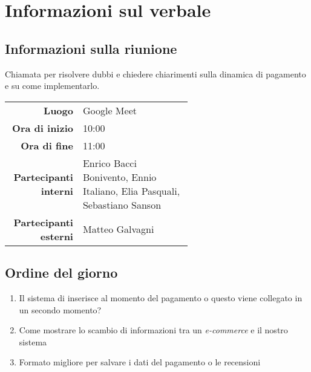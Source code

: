 \section{Informazioni sul verbale}

\subsection{Informazioni sulla riunione}
Chiamata per risolvere dubbi e chiedere chiarimenti sulla dinamica di pagamento e su come implementarlo.

\begin{center}
	\begin{tabular}{r|p{0.6\linewidth}}
		\toprule
		\textbf{Luogo} & Google Meet \\
		\textbf{Ora di inizio} & 10:00 \\
		\textbf{Ora di fine} & 11:00 \\
		\textbf{Partecipanti interni} & Enrico Bacci Bonivento, Ennio Italiano, Elia Pasquali, Sebastiano Sanson \\
		\textbf{Partecipanti esterni} & Matteo Galvagni
	\end{tabular}
\end{center}

\medskip

\subsection{Ordine del giorno}

\begin{enumerate}
	\item Il sistema di inserisce al momento del pagamento o questo viene collegato in un secondo momento?
	\item Come mostrare lo scambio di informazioni tra un \textit{e-commerce} e il nostro sistema
	\item Formato migliore per salvare i dati del pagamento o le recensioni
\end{enumerate}
